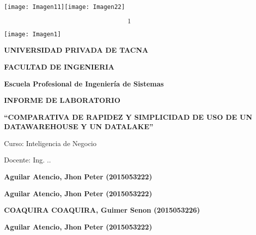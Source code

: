 \documentclass{article} %
\begin{document}


\noindent 

\noindent 

\noindent 

\noindent 

\noindent \texttt{[image: Imagen11]}\texttt{[image: Imagen22]}\textbf{ }

\noindent 

\noindent 
\[1\] 


\noindent \texttt{[image: Imagen1]}\textbf{\underbar{}}

\noindent \textbf{}

\noindent \textbf{UNIVERSIDAD PRIVADA DE TACNA}

\noindent \textbf{}

\noindent \textbf{FACULTAD DE INGENIERIA}

\noindent \textbf{\textit{}}

\noindent \textbf{\textit{}}

\noindent \textbf{Escuela Profesional de Ingenier\'{i}a de Sistemas}

\noindent \textbf{}

\noindent 

\noindent \textbf{ INFORME DE LABORATORIO}

\noindent \textbf{``COMPARATIVA DE RAPIDEZ Y SIMPLICIDAD DE USO DE UN DATAWAREHOUSE Y UN DATALAKE''}

\noindent \textbf{}

\noindent Curso: Inteligencia de Negocio

\noindent \textbf{\textit{}}

\noindent \textbf{}

\noindent \textbf{}

\noindent Docente: Ing. ..

\noindent \textbf{}

\noindent \textbf{Aguilar Atencio, Jhon Peter (2015053222)}

\noindent \textbf{Aguilar Atencio, Jhon Peter (2015053222)}

\noindent \textbf{COAQUIRA COAQUIRA, Guimer Senon (2015053226)}

\noindent \textbf{Aguilar Atencio, Jhon Peter (2015053222)}

\noindent \textbf{}
\end{document}
